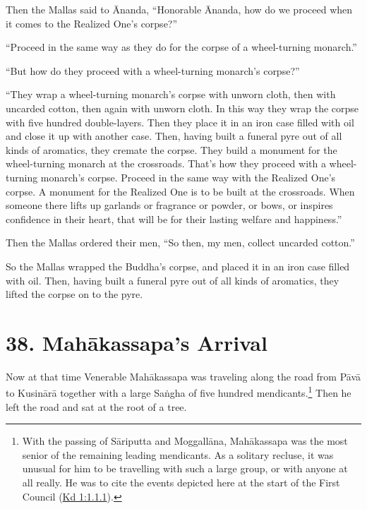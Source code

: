 \documentclass[12pt,openany]{book}%
\begin{document}
Then the Mallas said to Ānanda, “Honorable Ānanda, how do we proceed when it comes to the Realized One’s corpse?” 

“Proceed in the same way as they do for the corpse of a wheel-turning monarch.” 

“But how do they proceed with a wheel-turning monarch’s corpse?” 

“They wrap a wheel-turning monarch’s corpse with unworn cloth, then with uncarded cotton, then again with unworn cloth. In this way they wrap the corpse with five hundred double-layers. Then they place it in an iron case filled with oil and close it up with another case. Then, having built a funeral pyre out of all kinds of aromatics, they cremate the corpse. They build a monument for the wheel-turning monarch at the crossroads. That’s how they proceed with a wheel-turning monarch’s corpse. Proceed in the same way with the Realized One’s corpse. A monument for the Realized One is to be built at the crossroads. When someone there lifts up garlands or fragrance or powder, or bows, or inspires confidence in their heart, that will be for their lasting welfare and happiness.” 

Then the Mallas ordered their men, “So then, my men, collect uncarded cotton.” 

So the Mallas wrapped the Buddha’s corpse, and placed it in an iron case filled with oil. Then, having built a funeral pyre out of all kinds of aromatics, they lifted the corpse on to the pyre. 

\section*{38. \textsanskrit{Mahākassapa}’s Arrival }

Now at that time Venerable \textsanskrit{Mahākassapa} was traveling along the road from \textsanskrit{Pāvā} to \textsanskrit{Kusinārā} together with a large \textsanskrit{Saṅgha} of five hundred mendicants.\footnote{With the passing of \textsanskrit{Sāriputta} and \textsanskrit{Moggallāna}, \textsanskrit{Mahākassapa} was the most senior of the remaining leading mendicants. As a solitary recluse, it was unusual for him to be travelling with such a large group, or with anyone at all really. He was to cite the events depicted here at the start of the First Council (\href{https://suttacentral.net/pli-tv-kd1/en/sujato\#1.1.1}{Kd 1:1.1.1}). } Then he left the road and sat at the root of a tree. 
\end{document}

